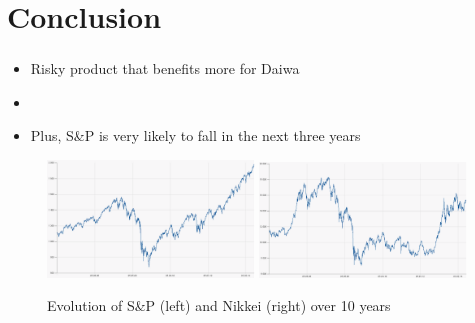 \section{Conclusion}

\begin{frame}[c]
\frametitle{\insertsection}
\begin{itemize}
	\item Risky product that benefits more for Daiwa
	\item []
	\item Plus, S\&P is very likely to fall in the next three years
\end{itemize}
\begin{figure}
	\centering
		\includegraphics[width=0.49\textwidth]{../Report/SandP500_evolution}
		\includegraphics[width=0.49\textwidth]{../Report/Nikkei225_evolution}
	\caption{Evolution of S\&P (left) and Nikkei (right) over 10 years}
\end{figure}
\end{frame}